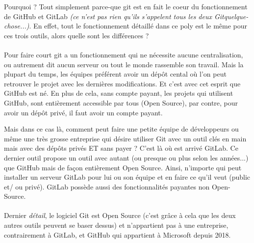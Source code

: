 \documentclass[french, a4paper, 12pt, titlepage]{article}
\begin{document}
Pourquoi ? Tout simplement parce-que git est en fait le coeur du fonctionnement de GitHub et GitLab \emph{(ce n'est pas rien qu'ils s'appelent tous les deux Gitquelque-chose...)}. En effet, tout le fonctionnement détaillé dans ce poly est le même pour ces trois outils, alors quelle sont les différences ?

\paragraph{}Pour faire court git a un fonctionnement qui ne nécessite aucune centralisation, ou autrement dit aucun serveur ou tout le monde rassemble son travail. Mais la plupart du temps, les équipes préférent avoir un dépôt cental où l'on peut retrouver le projet avec les dernières modifications. Et c'est avec cet esprit que GitHub est né. En plus de cela, sans compte payant, les projets qui utilisent GitHub, sont entièrement accessible par tous (Open Source), par contre, pour avoir un dépôt privé, il faut avoir un compte payant.

Mais dans ce cas là, comment peut faire une petite équipe de développeurs ou
même une très grosse entreprise qui désire utiliser Git avec un outil clés en
main mais avec des dépôts privés ET sans payer ? C'est là où est arrivé GitLab.
Ce dernier outil propose un outil avec autant (ou presque ou plus selon les
années...) que GitHub mais de façon entièrement Open Source. Ainsi, n'importe
qui peut installer un serveur GitLab pour lui ou son équipe et en faire ce
qu'il veut (public et/ ou privé). GitLab possède aussi des fonctionnalités
payantes non Open-Source.

\paragraph{}Dernier \emph{détail}, le logiciel Git est Open Source (c'est grâce
à cela que les deux autres outils peuvent se baser dessus) et n'appartient pas
à une entreprise, contrairement à GitLab, et GitHub qui appartient à Microsoft
depuis 2018.
\end{document}

